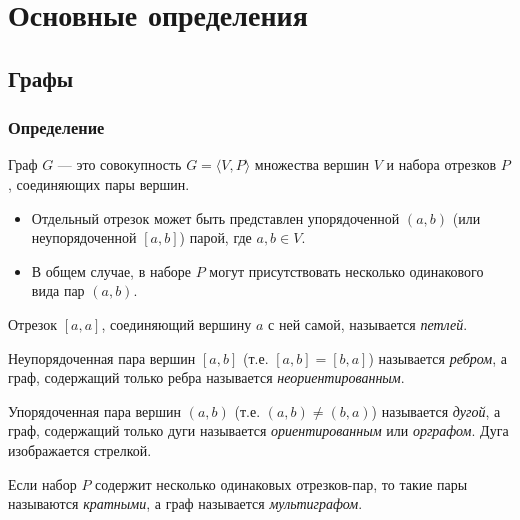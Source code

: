 \section{Основные определения}

\subsection{Графы}

\begin{frame}
    \frametitle{Определение}
    
    \begin{definition}
        Граф $G$ --- это совокупность $G=\langle V,P\rangle$ \alert{множества} вершин $V$ и \alert{набора} отрезков $P$, соединяющих пары вершин. 
    \end{definition}

    \begin{itemize}
        \item Отдельный отрезок может быть представлен упорядоченной $(a,b)$ (или неупорядоченной $[a,b]$) парой, где $a,b\in V$.
    
        \item В общем случае, в \alert{наборе} $P$ могут присутствовать несколько одинакового вида пар $(a,b)$.
    \end{itemize}
\end{frame}

Отрезок $[a,a]$, соединяющий вершину $a$ с ней самой, называется \emph{петлей}.

Неупорядоченная пара вершин $[a,b]$ (т.е. $[a,b]=[b,a]$) называется \emph{ребром}, а граф, содержащий только ребра называется \emph{неориентированным}.

Упорядоченная пара вершин $(a,b)$ (т.е. $(a,b)\neq(b,a)$) называется \emph{дугой}, а граф, содержащий только дуги называется \emph{ориентированным} или \emph{орграфом}. Дуга изображается стрелкой.

Если набор $P$ содержит несколько одинаковых отрезков-пар, то такие пары называются \emph{кратными}, а граф называется \emph{мультиграфом}.

